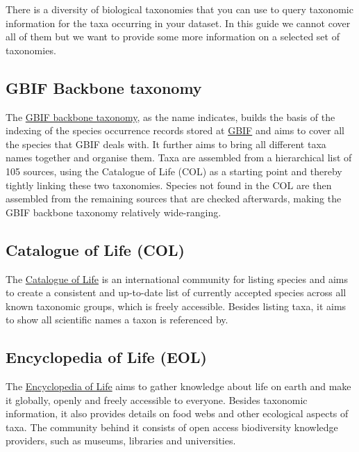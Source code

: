 \documentclass[
  oneside]{book}
\begin{document}
There is a diversity of biological taxonomies that you can use to query taxonomic information for the taxa occurring in your dataset. In this guide we cannot cover all of them but we want to provide some more information on a selected set of taxonomies.

\subsection{GBIF Backbone taxonomy}\label{gbif-backbone-taxonomy}

The \href{https://doi.org/10.15468/39omei}{GBIF backbone taxonomy}, as the name indicates, builds the basis of the indexing of the species occurrence records stored at \hyperref[GBIF]{GBIF} and aims to cover all the species that GBIF deals with. It further aims to bring all different taxa names together and organise them. Taxa are assembled from a hierarchical list of 105 sources, using the Catalogue of Life (COL) as a starting point and thereby tightly linking these two taxonomies. Species not found in the COL are then assembled from the remaining sources that are checked afterwards, making the GBIF backbone taxonomy relatively wide-ranging.

\subsection{Catalogue of Life (COL)}\label{catalogue-of-life-col}

The \href{https://www.catalogueoflife.org/}{Catalogue of Life} is an international community for listing species and aims to create a consistent and up-to-date list of currently accepted species across all known taxonomic groups, which is freely accessible. Besides listing taxa, it aims to show all scientific names a taxon is referenced by.

\subsection{Encyclopedia of Life (EOL)}\label{encyclopedia-of-life-eol}

The \href{https://www.eol.org/}{Encyclopedia of Life} aims to gather knowledge about life on earth and make it globally, openly and freely accessible to everyone. Besides taxonomic information, it also provides details on food webs and other ecological aspects of taxa. The community behind it consists of open access biodiversity knowledge providers, such as museums, libraries and universities.
\end{document}
